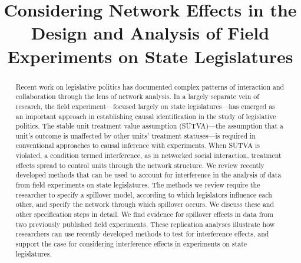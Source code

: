 \documentclass[12pt]{article}
\title{\vspace{-2cm} Considering Network Effects in the Design and Analysis of Field Experiments on State Legislatures }
\begin{document}
\maketitle




\begin{abstract} 
\vspace{.3cm}
\vspace{.3cm}

\noindent  Recent work on legislative politics has documented complex patterns of interaction and collaboration through the lens of network analysis. In a largely separate vein of research, the field experiment---focused largely on state legislatures---has emerged as an important approach in establishing causal identification in the study of legislative politics. The stable unit treatment value assumption (SUTVA)---the assumption that a unit's outcome is unaffected by other units' treatment statuses---is required in conventional approaches to causal inference with experiments. When SUTVA is violated, a condition termed interference, as in networked social interaction, treatment effects spread to control units through the network structure. We review recently developed methods that can be used to account for interference in the analysis of data from field experiments on state legislatures. The methods we review require the researcher to specify a spillover model, according to which legislators influence each other, and specify the network through which spillover occurs. We discuss these and other specification steps in detail. We find evidence for spillover effects in data from two previously published field experiments. These replication analyses illustrate how researchers can use recently developed methods to test for interference effects, and support the case for considering interference effects in experiments on state legislatures.%
\\~\\~\\
\end{abstract}
\end{document}
